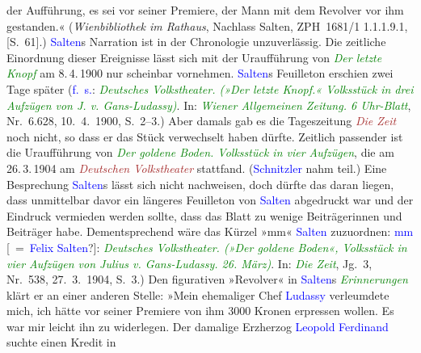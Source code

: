 {{{                     der Aufführung, es sei vor seiner Premiere, der Mann mit dem Revolver vor ihm
                     gestanden.« (\emph{Wienbibliothek im Rathaus}, Nachlass Salten, ZPH 1681/1
                     1.1.1.9.1, [S. 61].) \textcolor{blue}{Salten}s
                  Narration ist in der Chronologie unzuverlässig. Die zeitliche Einordnung dieser
                  Ereignisse lässt sich mit der Uraufführung von \emph{\textcolor{green}{Der
                     letzte Knopf}} am 8. 4. 1900 nur scheinbar vornehmen. \textcolor{blue}{Salten}s Feuilleton erschien zwei Tage später (\textcolor{blue}{f. s.}: \emph{\textcolor{green}{Deutsches Volkstheater. (»Der letzte Knopf.« Volksstück in drei Aufzügen
                        von J. v. Gans-Ludassy)}}. In: \emph{\textcolor{green}{Wiener
                        Allgemeinen Zeitung. 6 Uhr-Blatt}}, Nr. 6.628, 10. 4. 1900,
                     S. 2–3.) Aber damals gab es die Tageszeitung \emph{\textcolor{brown}{Die Zeit}} noch nicht, so dass er das Stück verwechselt
                  haben dürfte. Zeitlich passender ist die Uraufführung von \emph{\textcolor{green}{Der goldene Boden. Volksstück in vier Aufzügen}}, die am
                     26. 3. 1904 am
                     \emph{\textcolor{brown}{Deutschen Volkstheater}} stattfand. (\textcolor{blue}{Schnitzler} nahm teil.) Eine Besprechung \textcolor{blue}{Salten}s lässt sich nicht nachweisen, doch
                  dürfte das daran liegen, dass unmittelbar davor ein längeres Feuilleton von \textcolor{blue}{Salten} abgedruckt war und der Eindruck
                  vermieden werden sollte, dass das Blatt zu wenige Beiträgerinnen und Beiträger
                  habe. Dementsprechend wäre das Kürzel »mm« \textcolor{blue}{Salten} zuzuordnen: \textcolor{blue}{mm} [ = \textcolor{blue}{Felix Salten}?]: \emph{\textcolor{green}{Deutsches
                        Volkstheater. (»Der goldene Boden«, Volksstück in vier Aufzügen von Julius
                        v. Gans-Ludassy. 26. März)}}. In: \emph{\textcolor{green}{Die
                        Zeit}}, Jg. 3, Nr. 538, 27. 3. 1904, S. 3.)
                  Den figurativen
                  »Revolver« in \textcolor{blue}{Salten}s \emph{\textcolor{green}{Erinnerungen}}
                   klärt er an
                  einer anderen Stelle: »Mein ehemaliger Chef \textcolor{blue}{Ludassy}
                     verleumdete mich, ich hätte vor seiner Premiere von ihm 3000 Kronen erpressen
                     wollen. Es war mir leicht ihn zu widerlegen. Der damalige Erzherzog \textcolor{blue}{Leopold Ferdinand} suchte einen Kredit in
}}}
